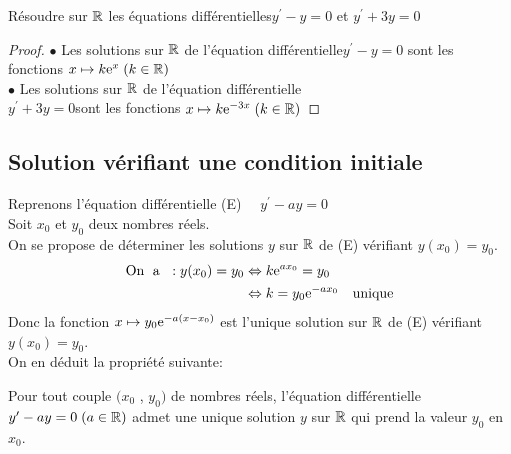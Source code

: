 \begin{example}
Résoudre sur $ \mathbb{R} $ les équations différentielles\;$ y^{\prime}-y=0 $\;  et\; $ y^{\prime}+3y=0 $
\end{example}
\begin{proof}
$ \bullet $ Les solutions sur $ \mathbb{R} $ de l'équation différentielle\;$ y^{\prime}-y=0 $  sont les fonctions  $ x\mapsto k\mathrm{e}^{x}\; (k\in\mathbb{R}) $\\
$ \bullet $ Les solutions sur $ \mathbb{R} $ de l'équation différentielle\\                                         $ y^{\prime}+3y=0 $\;sont les fonctions  $ x\mapsto k\mathrm{e}^{-3x}\; (k\in\mathbb{R}) $
\end{proof}

\subsection*{Solution vérifiant une condition initiale}

Reprenons l'équation différentielle (E)  $\quad  y^{\prime}-ay=0 $\\
Soit $ x_{0}$ et $y_{0} $  deux nombres réels.\\
On se propose de déterminer les solutions  $ y $ sur $ \mathbb{R} $  de (E)  vérifiant \; $ y(x_{0})=y_{0} $.
\begin{align*}
\text{On \;a }\;: y(x_{0})=y_{0} &\Leftrightarrow k\mathrm{e}^{ax_{0}}=y_{0}\\
&\Leftrightarrow k=y_{0}\mathrm{e}^{-ax_{0}}\quad \text{unique}
\end{align*}
Donc la fonction \; $ x\mapsto y_{0}\mathrm{e}^{-a(x-x_{0})} $\; est l'unique solution sur $ \mathbb{R} $  de (E)  vérifiant \; $ y(x_{0})=y_{0} $.\\
On en déduit la propriété suivante:

\begin{property}
Pour tout couple \;$ (x_{0}$ , $y_{0}) $\; de nombres réels, l'équation différentielle  \; $ y^{\prime}-ay=0 \;(a\in\mathbb{R})$\; admet une unique solution $ y $ sur $ \mathbb{R} $  qui prend la valeur $y_{0} $ en $x_{0} $.
\end{property}

